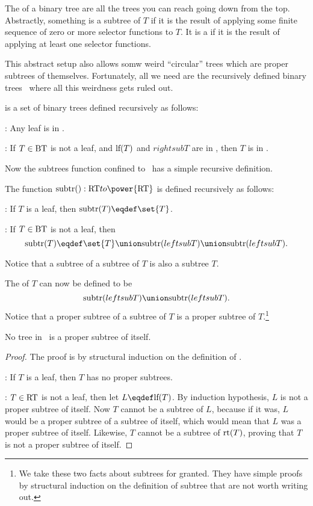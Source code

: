 The  of a binary tree are all the trees you can reach
going down from the top.  Abstractly, something is a subtree of $T$ if
it is the result of applying some finite sequence of zero or more
selector functions to $T$.  It is a  if it is the
result of applying at least one selector functions.

This abstract setup also allows somw weird ``circular'' trees which
are proper subtrees of themselves.  Fortunately, all we need are the
recursively defined binary trees \rectree\ where all this weirdness
gets ruled out.

\begin{definition}
\rectree is a set of binary trees defined recursively as follows:

:  Any leaf is in \rectree.

: If $T \in \text{BT}$ is not a leaf,
and $\text{lf}(T)$ and $rightsub{T}$ are in \rectree, then $T$ is in
\rectree.
\end{definition}

Now the subtrees function confined to \rectree\ has a simple recursive
definition.

\begin{definition}
The function $\subtrees{}: \rectree to \power{\rectree}$ is defined recursively as follows:

: If $T$ is a leaf, then $\subtrees{T} \eqdef
\set{T}$.

: If $T \in \text{BT}$ is not a leaf,
then
\[
\subtrees{T} \eqdef \set{T} \union \subtrees{leftsub{T}} \union
\subtrees{leftsub{T}}.
\]
\end{definition}
Notice that a subtree of a subtree of $T$ is also a subtree $T$.

The  of $T$ can now be defined to be
\[
\subtrees{leftsub{T}} \union \subtrees{leftsub{T}}.
\]
Notice that a proper subtree of a subtree of $T$ is a proper subtree
of $T$.\footnote{We take these two facts about subtrees for granted.
  They have simple proofs by structural induction on the definition of
  subtree that are not worth writing out.}

\begin{lemma}\label{}
No tree in \rectree\ is a proper subtree of itself.
\end{lemma}

\begin{proof}
The proof is by structural induction on the definition of \rectree.

: If $T$ is a leaf, then $T$ has no proper
subtrees.

: $T \in \text{RT}$ is not a leaf, then
let $L \eqdef \leftsub{T}$.  By induction hypothesis, $L$ is not a
proper subtree of itself.  Now $T$ cannot be a subtree of $L$, because
if it was, $L$ would be a proper subtree of a subtree of itself, which
would mean that $L$ was a proper subtree of itself.  Likewise, $T$
cannot be a subtree of $\text{rt}(T)$, proving that $T$ is not a
proper subtree of itself.
\end{proof}

